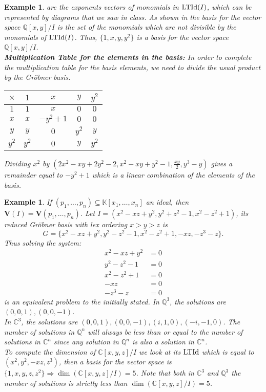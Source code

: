 \documentclass[a4paper,12pt]{article}
\newtheorem{example}[theorem]{Example}
\newcommand{\KK}{\mathbb{K}}
\newcommand{\CC}{\mathbb{C}}
\newcommand{\QQ}{\mathbb{Q}}
\newcommand{\LTId }{{\rm LTId}}
\newcommand{\vrty}{\textbf{V}}
\begin{document}
\begin{example}
	are the exponents vectors of monomials in $\LTId(I)$, which can be represented by diagrams that we saw in class.
	As shown in \cite{CoxLittleOshea} the basis for the vector space $\QQ[x,y]/I$ is the set of the monomials which are not divisible by the monomials of $\LTId(I)$. Thus, $\{1,x,y,y^2\}$ is a basis for the vector space $\QQ[x,y]/I$.
	\\
	\textbf{Multiplication Table for the elements in the basis:}
	In order to complete the multiplication table for the basis elements, we need to divide the usual product by the Gr\"obner basis. 
	\begin{center}
		\begin{tabular}{c|c|c|c|c|}
			$\times$ & $1$ & $x$ & $y$ & $y^2$ \\
			\hline
			$1$ & $1$ & $x$ & $0$ & $0$ \\ 
			\hline
			$x$ & $x$ & $-y^2+1$ & $0$ & $0$ \\ 
			\hline
			$y$ & $y$ & $0$ & $y^2$ & $y$ \\ 
			\hline
			$y^2$ & $y^2$ & $0$ & $y$ & $y^2$ \\ 
			\hline
		\end{tabular}
	\end{center}
	Dividing $x^2$ by $(2x^2-xy+2y^2-2, x^2-xy+y^2-1, \frac{xy}{2}, y^3-y)$ gives a remainder equal to $-y^2+1$ which is a linear combination of the elements of the basis. 
\end{example}
\begin{example}
	If $(p_1, \ldots, p_n )\subseteq \KK[x_1, \ldots, x_n]$ an ideal, then $\vrty(I) = \vrty(p_1, \ldots, p_n)$. Let $I = (x^2-xz+y^2, y^2+z^2-1, x^2-z^2+1)$, its reduced Gr\"obner basis with lex ordering $x > y > z$ is
	$$ G = \{x^2-xz+y^2, y^2-z^2-1, x^2-z^2+1, -xz, -z^3-z\}.$$
	Thus solving the system:
	\begin{align*}
	x^2-xz+y^2 &= 0 \\ 
	y^2-z^2-1 &= 0 \\ 
	x^2-z^2+1 &= 0 \\
	-xz &= 0 \\
	-z^3-z &= 0 
	\end{align*}
	is an equivalent problem to the initially stated. In $\QQ^3$, the solutions are $(0,0,1) , (0,0,-1)$. \\
	In $\CC^3$, the solutions are $(0,0,1), (0,0,-1), (i,1,0),(-i,-1,0)$. The number of solutions in $\QQ^n$ will always be less than or equal to the number of solutions in $\CC^n$ since any solution in $\QQ^n$ is also a solution in $\CC^n$.\\
	To compute the dimension of $\CC[x,y,z]/I$ we look at its $\LTId$ which is equal to $(x^2, y^2, -xz, z^3)$, then a basis for the vector space is $\{1,x,y,z,z^2\} \Rightarrow \dim(\CC[x,y,z]/I) = 5$. Note that both in $\CC^3$ and $\QQ^3$ the number of solutions is strictly less than $\dim(\CC[x,y,z]/I) = 5$.
\end{example}
\end{document}

